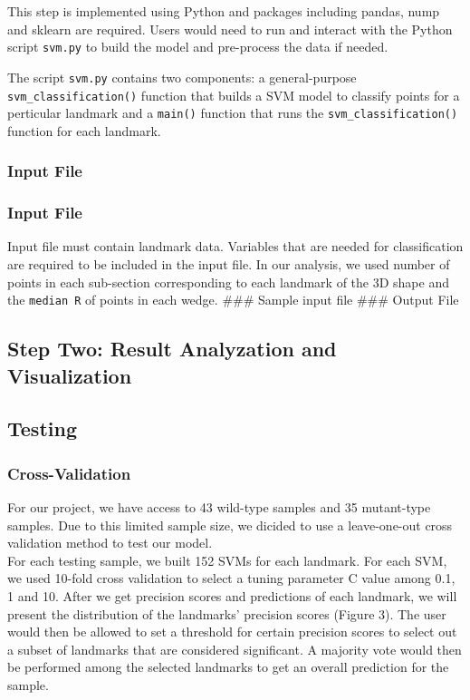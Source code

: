 \documentclass[10pt,letterpaper]{article}
\begin{document}
This step is implemented using Python and packages including pandas,
nump and sklearn are required. Users would need to run and interact with
the Python script \texttt{svm.py} to build the model and pre-process the
data if needed.

The script \texttt{svm.py} contains two components: a general-purpose
\texttt{svm\_classification()} function that builds a SVM model to
classify points for a perticular landmark and a \texttt{main()} function
that runs the \texttt{svm\_classification()} function for each landmark.

\subsubsection{Input File}\label{input-file}

\subsubsection{Input File}\label{input-file-1}

Input file must contain landmark data. Variables that are needed for
classification are required to be included in the input file. In our
analysis, we used number of points in each sub-section corresponding to
each landmark of the 3D shape and the \texttt{median\ R} of points in
each wedge. \#\#\# Sample input file \#\#\# Output File

\subsection{Step Two: Result Analyzation and
Visualization}\label{step-two-result-analyzation-and-visualization}

\subsection{Testing}\label{testing}

\subsubsection{Cross-Validation}\label{cross-validation}

For our project, we have access to 43 wild-type samples and 35
mutant-type samples. Due to this limited sample size, we dicided to use
a leave-one-out cross validation method to test our model.\\
For each testing sample, we built 152 SVMs for each landmark. For each
SVM, we used 10-fold cross validation to select a tuning parameter C
value among 0.1, 1 and 10. After we get precision scores and predictions
of each landmark, we will present the distribution of the landmarks'
precision scores (Figure 3). The user would then be allowed to set a
threshold for certain precision scores to select out a subset of
landmarks that are considered significant. A majority vote would then be
performed among the selected landmarks to get an overall prediction for
the sample.
\end{document}

